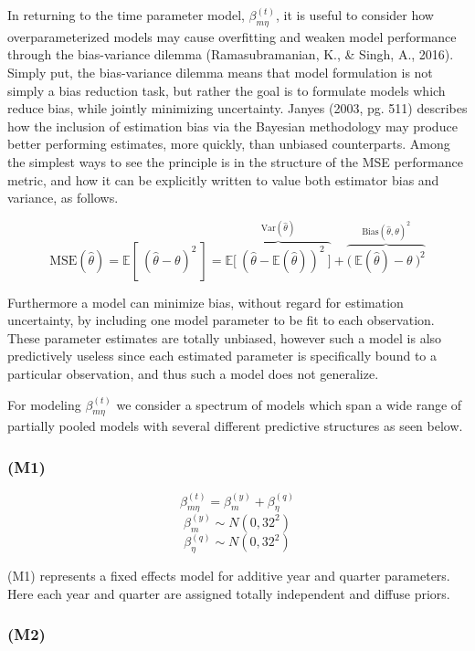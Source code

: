 \documentclass[12pt]{article}
\begin{document}
In returning to the time parameter model, \(\beta^{(t)}_{m\eta}\), it is
useful to consider how overparameterized models may cause overfitting
and weaken model performance through the bias-variance dilemma
(Ramasubramanian, K., \& Singh, A., 2016). Simply put, the bias-variance
dilemma means that model formulation is not simply a bias reduction
task, but rather the goal is to formulate models which reduce bias,
while jointly minimizing uncertainty. Janyes (2003, pg. 511) describes
how the inclusion of estimation bias via the Bayesian methodology may
produce better performing estimates, more quickly, than unbiased
counterparts. Among the simplest ways to see the principle is in the
structure of the MSE performance metric, and how it can be explicitly
written to value both estimator bias and variance, as follows.

\[\text{MSE}(\hat\theta) = \mathbb{E}\left[~(\hat\theta - \theta)^2~\right] = \overbrace{\mathbb{E}\Big[~\left(\hat\theta-\mathbb{E}(\hat\theta)\right)^2~\Big]}^{\text{Var}(\hat \theta)} + \overbrace{\Big(~\mathbb{E}(\hat\theta)-\theta~\Big)^2}^{\text{Bias}(\hat \theta, \theta)^2}\]

Furthermore a model can minimize bias, without regard for estimation
uncertainty, by including one model parameter to be fit to each
observation. These parameter estimates are totally unbiased, however
such a model is also predictively useless since each estimated parameter
is specifically bound to a\\
particular observation, and thus such a model does not generalize.

For modeling \(\beta^{(t)}_{m\eta}\) we consider a spectrum of models
which span a wide range of partially pooled models with several
different predictive structures as seen below.

\subsubsection{(M1)}\label{m1}

\[\beta^{(t)}_{m\eta} = \beta^{(y)}_{m} + \beta^{(q)}_{\eta}\]
\[\beta^{(y)}_{m} \sim N(0, 32^2)\]
\[\beta^{(q)}_{\eta} \sim N(0, 32^2)\]

(M1) represents a fixed effects model for additive year and quarter
parameters. Here each year and quarter are assigned totally independent
and diffuse priors.

\subsubsection{(M2)}\label{m2}
\end{document}
